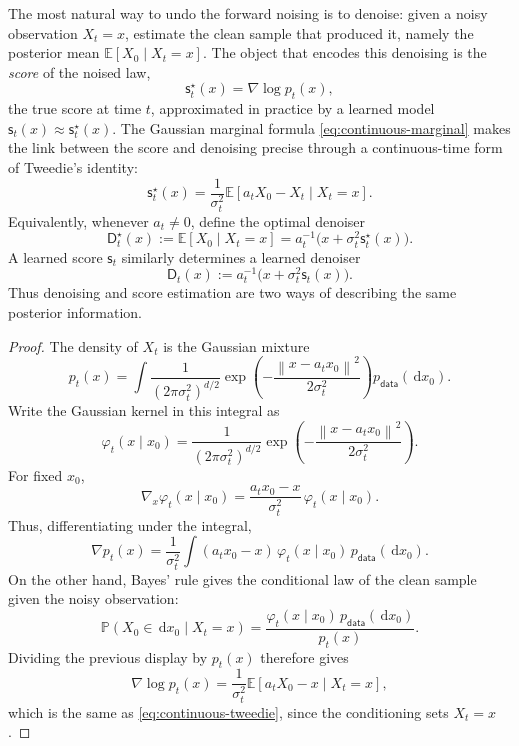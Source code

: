 \documentclass{amsart}
\numberwithin{equation}{section}
\theoremstyle{plain}
\theoremstyle{definition}
\theoremstyle{remark}
\newcommand{\E}{\mathbb{E}}
\newcommand{\Pp}{\mathbb{P}}
\newcommand{\dd}{\,\mathrm{d}}
\newcommand{\norm}[1]{\left\lVert #1 \right\rVert}
\newcommand{\pdata}{p_{\mathsf{data}}}
\newcommand{\sstar}{\mathsf{s}^{\star}}
\newcommand{\score}{\mathsf{s}}
\newcommand{\dstar}{\mathsf{D}^{\star}}
\newcommand{\denoiser}{\mathsf{D}}
\begin{document}
The most natural way to undo the forward noising is to denoise: given a noisy
observation $X_t=x$, estimate the clean sample that produced it, namely the
posterior mean $\E[X_0\mid X_t=x]$.  The object that encodes this denoising is
the \emph{score} of the noised law,
\begin{equation}\label{eq:continuous-score}
    \sstar_t(x)=\nabla\log p_t(x),
\end{equation}
the true score at time $t$, approximated in practice by a learned model
$\score_t(x)\approx\sstar_t(x)$.  The Gaussian marginal formula
\eqref{eq:continuous-marginal} makes the link between the score and denoising
precise through a continuous-time form of Tweedie's identity:
\begin{equation}\label{eq:continuous-tweedie}
    \sstar_t(x)
    =
    \frac{1}{\sigma_t^2}
    \E[a_tX_0-X_t\mid X_t=x].
\end{equation}
Equivalently, whenever $a_t\neq0$, define the optimal denoiser
\[
    \dstar_t(x)
    :=
    \E[X_0\mid X_t=x]
    =
    a_t^{-1}\bigl(x+\sigma_t^2\sstar_t(x)\bigr).
\]
A learned score $\score_t$ similarly determines a learned denoiser
\[
    \denoiser_t(x)
    :=
    a_t^{-1}\bigl(x+\sigma_t^2\score_t(x)\bigr).
\]
Thus denoising and score estimation are two ways of describing the same
posterior information.

\begin{proof}
The density of $X_t$ is the Gaussian mixture
\[
    p_t(x)=
    \int \frac{1}{(2\pi\sigma_t^2)^{d/2}}
    \exp\left(-\frac{\norm{x-a_tx_0}^2}{2\sigma_t^2}\right)
    \pdata(\dd x_0).
\]
Write the Gaussian kernel in this integral as
\[
    \varphi_t(x\mid x_0)
    =
    \frac{1}{(2\pi\sigma_t^2)^{d/2}}
    \exp\left(-\frac{\norm{x-a_tx_0}^2}{2\sigma_t^2}\right).
\]
For fixed $x_0$,
\[
    \nabla_x\varphi_t(x\mid x_0)
    =
    \frac{a_tx_0-x}{\sigma_t^2}\,\varphi_t(x\mid x_0).
\]
Thus, differentiating under the integral,
\[
    \nabla p_t(x)
    =
    \frac{1}{\sigma_t^2}
    \int (a_tx_0-x)\,\varphi_t(x\mid x_0)\,\pdata(\dd x_0).
\]
On the other hand, Bayes' rule gives the conditional law of the clean sample
given the noisy observation:
\[
    \Pp(X_0\in\dd x_0\mid X_t=x)
    =
    \frac{\varphi_t(x\mid x_0)\,\pdata(\dd x_0)}{p_t(x)}.
\]
Dividing the previous display by $p_t(x)$ therefore gives
\[
    \nabla\log p_t(x)
    =
    \frac{1}{\sigma_t^2}
    \E[a_tX_0-x\mid X_t=x],
\]
which is the same as \eqref{eq:continuous-tweedie}, since the conditioning
sets $X_t=x$.
\end{proof}
\end{document}
